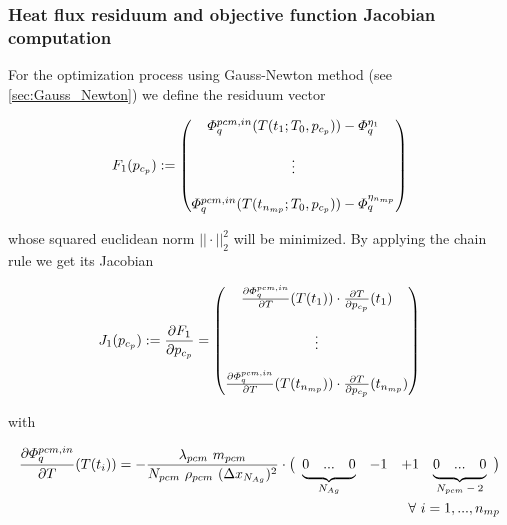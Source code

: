 \documentclass{scrartcl}[12pt, halfparskip]
\numberwithin{equation}{section}
\numberwithin{figure}{section}
\numberwithin{table}{section}
\newcommand\undermat[2]{%
	\makebox[0pt][l]{$\smash{\underbrace{\phantom{%
					\begin{matrix}#2\end{matrix}}}_{\text{$#1$}}}$}#2}
\begin{document}
\subsubsection{Heat flux residuum and objective function Jacobian computation}

For the optimization process using Gauss-Newton method (see \cref{sec:Gauss_Newton}) we define the residuum vector 

\begin{equation}
	F_1(p_{c_p}) :=
	\begin{pmatrix}
		\varPhi_{q}^{pcm,in}(T(t_1;T_0,p_{c_p})) - \varPhi_q^{\eta_1} \\
		\textcolor{white}{} \\
		\vdots \\
		\textcolor{white}{} \\
		\varPhi_{q}^{pcm,in}(T(t_{n_{mp}};T_0,p_{c_p})) - \varPhi_q^{\eta_{n_{mp}}}
	\end{pmatrix}
\end{equation}

whose squared euclidean norm $|| \cdot ||_2^2$ will be minimized. 
By applying the chain rule we get its Jacobian

\begin{equation}
	J_1(p_{c_p}) := \frac{\partial F_1}{\partial p_{c_p}} =
	\begin{pmatrix}
		\frac{\partial \varPhi_{q}^{pcm,in}}{\partial T}(T(t_1)) \cdot \frac{\partial T}{\partial p_{c_p}}(t_1) \\
		\textcolor{white}{} \\
		\vdots \\
		\textcolor{white}{} \\
		\frac{\partial \varPhi_{q}^{pcm,in}}{\partial T}(T(t_{n_{mp}})) \cdot \frac{\partial T}{\partial p_{c_p}}(t_{n_{mp}}) \\
	\end{pmatrix}
	\label{eq:optimization_jacobian}
\end{equation}

with

\begin{align}
	\frac{\partial \varPhi_{q}^{pcm,in}}{\partial T}(T(t_i)) = - \frac{\lambda_{pcm} \ m_{pcm}}{N_{pcm} \ \rho_{pcm} \ (\Delta x_{N_{Ag}})^2} \cdot
	\left(\begin{array}{cccccccc}
	\undermat{N_{Ag}}{0 & ... & 0} & -1 & +1 & \undermat{N_{pcm}-2}{0 & ... & 0}
	\end{array}\right) \\[2ex]
	\forall \ i = 1,...,n_{mp} \nonumber
\end{align}
\end{document}
